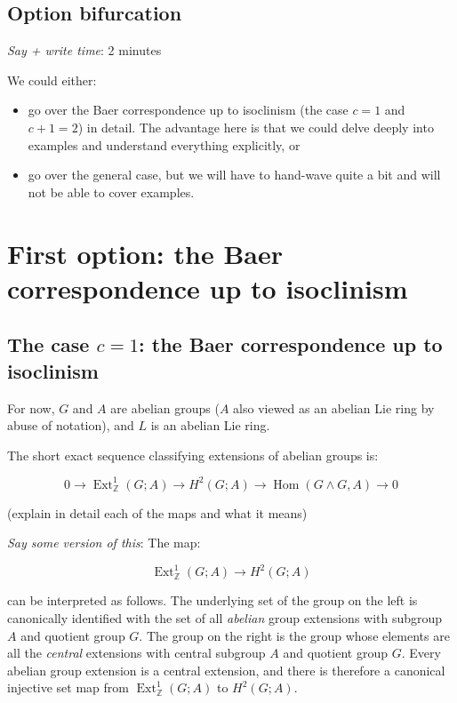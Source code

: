 \documentclass[10pt]{amsart}
\begin{document}
\subsection{Option bifurcation}

{\em Say + write time}: 2 minutes

We could either:

\begin{itemize}
\item go over the Baer correspondence up to isoclinism (the case $c =
  1$ and $c + 1 = 2$) in detail. The advantage here is that we could
  delve deeply into examples and understand everything explicitly, or
\item go over the general case, but we will have to hand-wave quite a
  bit and will not be able to cover examples.
\end{itemize}

\section{First option: the Baer correspondence up to isoclinism}

\subsection{The case $c = 1$: the Baer correspondence up to isoclinism}

For now, $G$ and $A$ are abelian groups ($A$ also viewed as an abelian
Lie ring by abuse of notation), and $L$ is an abelian Lie ring.

The short exact sequence classifying extensions of abelian groups is:

\begin{equation}\label{eq:ses-uct-abelian}
  0 \to \operatorname{Ext}^1_{\mathbb{Z}}(G;A) \to H^2(G;A) \to \operatorname{Hom}(G \wedge G,A) \to 0
\end{equation}

(explain in detail each of the maps and what it means)

{\em Say some version of this}: The map:

$$\operatorname{Ext}^1_{\mathbb{Z}}(G;A) \to H^2(G;A)$$

can be interpreted as follows. The underlying set of the group on the
left is canonically identified with the set of all {\em abelian} group
extensions with subgroup $A$ and quotient group $G$. The group on the
right is the group whose elements are all the {\em central} extensions
with central subgroup $A$ and quotient group $G$. Every abelian group
extension is a central extension, and there is therefore a canonical
injective set map from $\operatorname{Ext}^1_{\mathbb{Z}}(G;A)$ to
$H^2(G;A)$.
\end{document}

